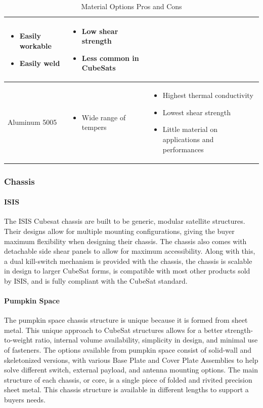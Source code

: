 \documentclass{ece}
\begin{document}
\begin{table}[H]
\begin{tabular}{|p{}|p{}|p{}|}
\begin{itemize}
        \item Easily workable
        \item Easily weld
    \end{itemize}
    &
    \begin{itemize}
        \item Low shear strength
        \item Less common in CubeSats
    \end{itemize}
    \\
\hline
    Aluminum 5005
    &
    \begin{itemize}
        \item Wide range of tempers
    \end{itemize}
    &
    \begin{itemize}
        \item Highest thermal conductivity
        \item Lowest shear strength
        \item Little material on applications and performances
    \end{itemize}
    \\
\hline
\end{tabular}
\caption{Material Options Pros and Cons}
\label{tbl:Material_ProCon}
\end{table}
\subsubsection{Chassis}

\paragraph{ISIS}
The ISIS Cubesat chassis are built to be generic, modular satellite structures. Their designs allow for multiple mounting configurations, giving the buyer maximum flexibility when designing their chassis. The chassis also comes with detachable side shear panels to allow for maximum accessibility. Along with this, a dual kill-switch mechanism is provided with the chassis, the chassis is scalable in design to larger CubeSat forms, is compatible with most other products sold by ISIS, and is fully compliant with the CubeSat standard. \cite{isis2} 
\paragraph{Pumpkin Space}
The pumpkin space chassis structure is unique because it is formed from sheet metal. This unique approach to CubeSat structures allows for a better strength-to-weight ratio, internal volume availability, simplicity in design, and minimal use of fasteners. The options available from pumpkin space consist of solid-wall and skeletonized versions, with various Base Plate and Cover Plate Assemblies to help solve different switch, external payload, and antenna mounting options. The main structure of each chassis, or core, is a single piece of folded and rivited precision sheet metal. This chassis structure is available in different lengths to support a buyers needs.\cite{pumpkin_space} 
\end{document}
